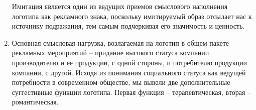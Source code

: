\begin{enumerate}
Имитация является один из ведущих приемов смыслового наполнения логотипа как рекламного знака, поскольку имитируемый образ отсылает нас к источнику подражания, тем самым подчеркивая его значимость и ценность.
\item Основная смысловая нагрузка, возлагаемая на логотип в общем пакете рекламных мероприятий – придание высокого статуса компании производителю и ее продукции, с одной стороны, и потребителю продукции компании, с другой. Исходя из понимания социального статуса как ведущей потребности в современном обществе, мы вывели две дополнительные суггестивные функции логотипа. Первая функция – терапевтическая, вторая – романтическая.
\end{enumerate}